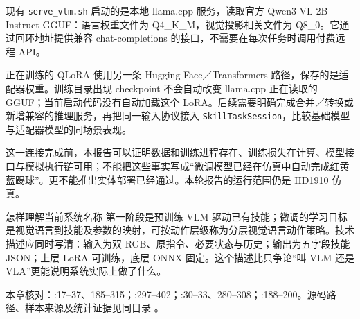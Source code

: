 现有 \texttt{serve\_vlm.sh} 启动的是本地 llama.cpp 服务，读取官方 Qwen3-VL-2B-Instruct GGUF：语言权重文件为 Q4\_K\_M，视觉投影相关文件为 Q8\_0。它通过回环地址提供兼容 chat-completions 的接口，不需要在每次任务时调用付费远程 API。

正在训练的 QLoRA 使用另一条 Hugging Face／Transformers 路径，保存的是适配器权重。训练目录出现 checkpoint 不会自动改变 llama.cpp 正在读取的 GGUF；当前启动代码没有自动加载这个 LoRA。后续需要明确完成合并／转换或新增兼容的推理服务，再把同一输入协议接入 \texttt{SkillTaskSession}，比较基础模型与适配器模型的同场景表现。

这一连接完成前，本报告可以证明数据和训练进程存在、训练损失在计算、模型接口与模拟执行链可用；不能把这些事实写成“微调模型已经在仿真中自动完成红黄蓝踢球”。更不能推出实体部署已经通过。本轮报告的运行范围仍是 HD1910 仿真。

\begin{notebox}{怎样理解当前系统名称}
第一阶段是预训练 VLM 驱动已有技能；微调的学习目标是视觉语言到技能及参数的映射，可按动作层级称为分层视觉语言动作策略。技术描述应同时写清：输入为双 RGB、原指令、必要状态与历史；输出为五字段技能 JSON；上层 LoRA 可训练，底层 ONNX 固定。这个描述比只争论“叫 VLM 还是 VLA”更能说明系统实际上做了什么。
\end{notebox}

本章核对：:17--37、185--315；:297--402；:30--33、280--308；:188--200。源码路径、样本来源及统计证据见同目录 。
